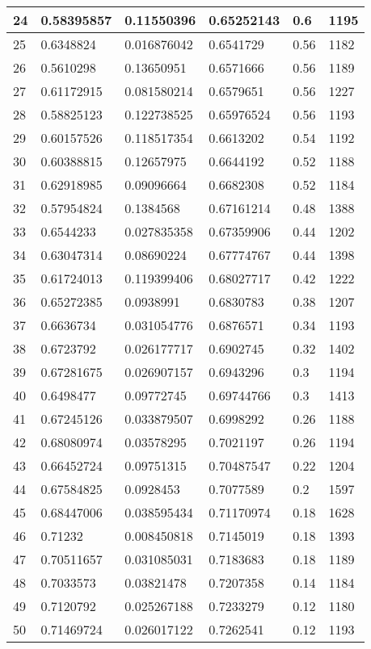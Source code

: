 \begin{longtable}{|l|l|l|l|l|l|}
24 & 0.58395857 & 0.11550396 & 0.65252143 & 0.6 & 1195 \\ \hline 
25 & 0.6348824 & 0.016876042 & 0.6541729 & 0.56 & 1182 \\ \hline 
26 & 0.5610298 & 0.13650951 & 0.6571666 & 0.56 & 1189 \\ \hline 
27 & 0.61172915 & 0.081580214 & 0.6579651 & 0.56 & 1227 \\ \hline 
28 & 0.58825123 & 0.122738525 & 0.65976524 & 0.56 & 1193 \\ \hline 
29 & 0.60157526 & 0.118517354 & 0.6613202 & 0.54 & 1192 \\ \hline 
30 & 0.60388815 & 0.12657975 & 0.6644192 & 0.52 & 1188 \\ \hline 
31 & 0.62918985 & 0.09096664 & 0.6682308 & 0.52 & 1184 \\ \hline 
32 & 0.57954824 & 0.1384568 & 0.67161214 & 0.48 & 1388 \\ \hline 
33 & 0.6544233 & 0.027835358 & 0.67359906 & 0.44 & 1202 \\ \hline 
34 & 0.63047314 & 0.08690224 & 0.67774767 & 0.44 & 1398 \\ \hline 
35 & 0.61724013 & 0.119399406 & 0.68027717 & 0.42 & 1222 \\ \hline 
36 & 0.65272385 & 0.0938991 & 0.6830783 & 0.38 & 1207 \\ \hline 
37 & 0.6636734 & 0.031054776 & 0.6876571 & 0.34 & 1193 \\ \hline 
38 & 0.6723792 & 0.026177717 & 0.6902745 & 0.32 & 1402 \\ \hline 
39 & 0.67281675 & 0.026907157 & 0.6943296 & 0.3 & 1194 \\ \hline 
40 & 0.6498477 & 0.09772745 & 0.69744766 & 0.3 & 1413 \\ \hline 
41 & 0.67245126 & 0.033879507 & 0.6998292 & 0.26 & 1188 \\ \hline 
42 & 0.68080974 & 0.03578295 & 0.7021197 & 0.26 & 1194 \\ \hline 
43 & 0.66452724 & 0.09751315 & 0.70487547 & 0.22 & 1204 \\ \hline 
44 & 0.67584825 & 0.0928453 & 0.7077589 & 0.2 & 1597 \\ \hline 
45 & 0.68447006 & 0.038595434 & 0.71170974 & 0.18 & 1628 \\ \hline 
46 & 0.71232 & 0.008450818 & 0.7145019 & 0.18 & 1393 \\ \hline 
47 & 0.70511657 & 0.031085031 & 0.7183683 & 0.18 & 1189 \\ \hline 
48 & 0.7033573 & 0.03821478 & 0.7207358 & 0.14 & 1184 \\ \hline 
49 & 0.7120792 & 0.025267188 & 0.7233279 & 0.12 & 1180 \\ \hline 
50 & 0.71469724 & 0.026017122 & 0.7262541 & 0.12 & 1193 \\ \hline 
\end{longtable}